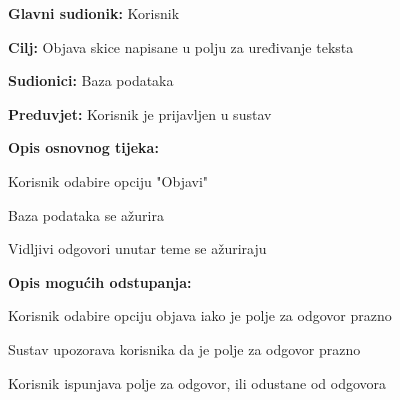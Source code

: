 					\noindent {}
					\begin{packed_item}
	
						\item \textbf{Glavni sudionik: }Korisnik
						\item  \textbf{Cilj:} Objava skice napisane u polju za uređivanje teksta
						\item  \textbf{Sudionici:} Baza podataka
						\item  \textbf{Preduvjet:} Korisnik je prijavljen u sustav
						\item  \textbf{Opis osnovnog tijeka:}
						
						\item[] \begin{packed_enum}
	
							\item Korisnik odabire opciju "Objavi" 
							\item Baza podataka se ažurira
							\item Vidljivi odgovori unutar teme se ažuriraju
							
							
						\end{packed_enum}
						\item  \textbf{Opis mogućih odstupanja:}
						
						\item[] \begin{packed_item}
						\item[2.a] Korisnik odabire opciju objava iako je polje za odgovor prazno
							\item[] \begin{packed_enum}
								
								\item Sustav upozorava korisnika da je polje za odgovor prazno
								\item Korisnik ispunjava polje za odgovor, ili odustane od odgovora
								
							\end{packed_enum}
						\end{packed_item}
						
						
					\end{packed_item}					
										
